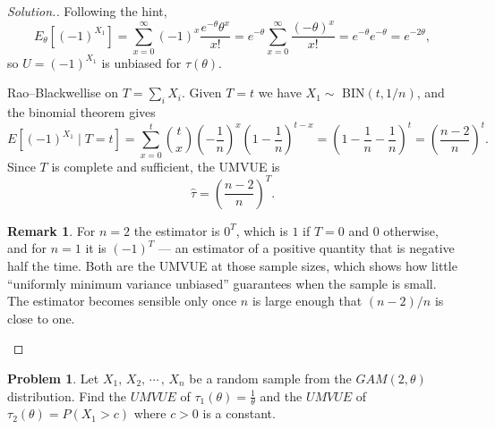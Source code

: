 \documentclass[12pt,a4paper]{report}
\theoremstyle{definition}
\newtheorem*{remark}{Remark}
\newtheorem{problemx}{Problem}[section]
\newenvironment{problem}{\begin{problemx}}{\end{problemx}}
\newenvironment{solution}
  {\renewcommand{\qedsymbol}{}\begin{proof}[\textit{Solution}.]}
  {\end{proof}}
\begin{document}
\begin{solution}
Following the hint,
\[E_{\theta}\left[(-1)^{X_1}\right]
= \sum_{x=0}^{\infty}(-1)^{x}\frac{e^{-\theta}\theta^{x}}{x!}
= e^{-\theta}\sum_{x=0}^{\infty}\frac{(-\theta)^{x}}{x!}
= e^{-\theta}e^{-\theta} = e^{-2\theta},\]
so $U=(-1)^{X_1}$ is unbiased for $\tau(\theta)$.

Rao--Blackwellise on $T=\sum_i X_i$. Given $T=t$ we have $X_1\sim$ BIN$(t,1/n)$,
and the binomial theorem gives
\[E\left[(-1)^{X_1}\mid T=t\right]
= \sum_{x=0}^{t}\binom{t}{x}\left(-\frac1n\right)^{x}\left(1-\frac1n\right)^{t-x}
= \left(1-\frac1n-\frac1n\right)^{t} = \left(\frac{n-2}{n}\right)^{t}.\]
Since $T$ is complete and sufficient, the UMVUE is
\[\widehat{\tau} = \left(\frac{n-2}{n}\right)^{T}.\]

\begin{remark}
For $n=2$ the estimator is $0^{T}$, which is $1$ if $T=0$ and $0$ otherwise, and
for $n=1$ it is $(-1)^{T}$ --- an estimator of a positive quantity that is
negative half the time. Both are the UMVUE at those sample sizes, which shows
how little ``uniformly minimum variance unbiased'' guarantees when the sample is
small. The estimator becomes sensible only once $n$ is large enough that
$(n-2)/n$ is close to one.
\end{remark}
\end{solution}

\begin{problem}
Let $X_1, \, X_2, \, \cdots\, , \, X_n$ be a random sample from the $GAM(2, \theta)$ distribution. Find the $UMVUE$ of $\tau_1(\theta) = \frac{1}{\theta}$ and the $UMVUE$ of $\tau_2(\theta) = P\left(X_1 > c\right)$ where $c>0$ is a constant.
\end{problem}
\end{document}
